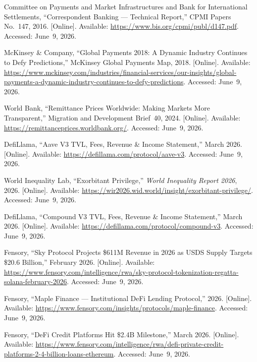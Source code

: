 \documentclass[12pt, a4paper]{report}
\begin{document}
{\begin{enumerate}[label={[\arabic*]}]
\item Committee on Payments and Market Infrastructures and Bank for International Settlements, ``Correspondent Banking --- Technical Report,'' CPMI Papers No.~147, 2016. [Online]. Available: \url{https://www.bis.org/cpmi/publ/d147.pdf}. Accessed: June~9, 2026.

\item McKinsey \& Company, ``Global Payments 2018: A Dynamic Industry Continues to Defy Predictions,'' McKinsey Global Payments Map, 2018. [Online]. Available: \url{https://www.mckinsey.com/industries/financial-services/our-insights/global-payments-a-dynamic-industry-continues-to-defy-predictions}. Accessed: June~9, 2026.

\item World Bank, ``Remittance Prices Worldwide: Making Markets More Transparent,'' Migration and Development Brief~40, 2024. [Online]. Available: \url{https://remittanceprices.worldbank.org/}. Accessed: June~9, 2026.

\item DefiLlama, ``Aave V3 TVL, Fees, Revenue \& Income Statement,'' March 2026. [Online]. Available: \url{https://defillama.com/protocol/aave-v3}. Accessed: June~9, 2026.

\item World Inequality Lab, ``Exorbitant Privilege,'' \textit{World Inequality Report 2026}, 2026. [Online]. Available: \url{https://wir2026.wid.world/insight/exorbitant-privilege/}. Accessed: June~9, 2026.

\item DefiLlama, ``Compound V3 TVL, Fees, Revenue \& Income Statement,'' March 2026. [Online]. Available: \url{https://defillama.com/protocol/compound-v3}. Accessed: June~9, 2026.

\item Fensory, ``Sky Protocol Projects \$611M Revenue in 2026 as USDS Supply Targets \$20.6 Billion,'' February 2026. [Online]. Available: \url{https://www.fensory.com/intelligence/rwa/sky-protocol-tokenization-regatta-solana-february-2026}. Accessed: June~9, 2026.

\item Fensory, ``Maple Finance --- Institutional DeFi Lending Protocol,'' 2026. [Online]. Available: \url{https://www.fensory.com/insights/protocols/maple-finance}. Accessed: June~9, 2026.

\item Fensory, ``DeFi Credit Platforms Hit \$2.4B Milestone,'' March 2026. [Online]. Available: \url{https://www.fensory.com/intelligence/rwa/defi-private-credit-platforms-2-4-billion-loans-ethereum}. Accessed: June~9, 2026.


\end{enumerate}}
\end{document}
